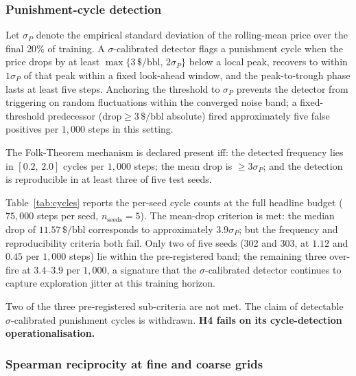 
\subsubsection{Punishment-cycle detection}
\label{subsec:cycles}

Let $\sigma_P$ denote the empirical standard deviation of the
rolling-mean price over the final $20\%$ of training. A
$\sigma$-calibrated detector flags a punishment cycle when the
price drops by at least $\max\{3\,\$\text{/bbl},\,2\sigma_P\}$
below a local peak, recovers to within $1\sigma_P$ of that peak
within a fixed look-ahead window, and the peak-to-trough phase
lasts at least five steps. Anchoring the threshold to $\sigma_P$
prevents the detector from triggering on random fluctuations
within the converged noise band; a fixed-threshold predecessor
($\text{drop} \geq 3\,\$\text{/bbl}$ absolute) fired
approximately five false positives per $1{,}000$ steps in this
setting.

The Folk-Theorem mechanism is declared present iff: the detected
frequency lies in $[0.2,\,2.0]$ cycles per $1{,}000$ steps; the
mean drop is $\geq 3\sigma_P$; and the detection is reproducible
in at least three of five test seeds.

Table~\ref{tab:cycles} reports the per-seed cycle counts at the
full headline budget ($75{,}000$ steps per seed,
$n_{\text{seeds}} = 5$). The mean-drop criterion is met: the
median drop of $11.57\,\$\text{/bbl}$ corresponds to
approximately $3.9\sigma_P$; but the frequency and
reproducibility criteria both fail. Only two of five seeds (302
and 303, at $1.12$ and $0.45$ per $1{,}000$ steps) lie within
the pre-registered band; the remaining three over-fire at
$3.4$--$3.9$ per $1{,}000$, a signature that the
$\sigma$-calibrated detector continues to capture exploration
jitter at this training horizon.

\begin{verdict*}
Two of the three pre-registered sub-criteria are not met. The
claim of detectable $\sigma$-calibrated punishment cycles is
withdrawn. \textbf{H4 fails on its cycle-detection
operationalisation.}
\end{verdict*}


\subsubsection{Spearman reciprocity at fine and coarse grids}
\label{subsec:reciprocity}

